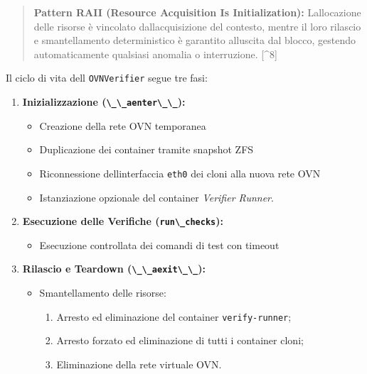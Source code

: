 \begin{quote}
\textbf{Pattern RAII (Resource Acquisition Is Initialization):}
L\textquotesingle allocazione delle risorse è vincolato
dall\textquotesingle acquisizione del contesto, mentre il loro rilascio
e smantellamento deterministico è garantito all\textquotesingle uscita
dal blocco, gestendo automaticamente qualsiasi anomalia o interruzione.
{[}\^{}8{]}
\end{quote}

Il ciclo di vita dell\textquotesingle{}
\passthrough{\lstinline!OVNVerifier!} segue tre fasi:

\begin{enumerate}
\def\labelenumi{\arabic{enumi}.}
\tightlist
\item
  \textbf{Inizializzazione (\passthrough{\lstinline!\_\_aenter\_\_!}):}

  \begin{itemize}
  \tightlist
  \item
    Creazione della rete OVN temporanea
  \item
    Duplicazione dei container tramite snapshot ZFS
  \item
    Riconnessione dell\textquotesingle interfaccia
    \passthrough{\lstinline!eth0!} dei cloni alla nuova rete OVN
  \item
    Istanziazione opzionale del container \emph{Verifier Runner}.
  \end{itemize}
\item
  \textbf{Esecuzione delle Verifiche
  (\passthrough{\lstinline!run\_checks!}):}

  \begin{itemize}
  \tightlist
  \item
    Esecuzione controllata dei comandi di test con timeout
  \end{itemize}
\item
  \textbf{Rilascio e Teardown
  (\passthrough{\lstinline!\_\_aexit\_\_!}):}

  \begin{itemize}
  \tightlist
  \item
    Smantellamento delle risorse:

    \begin{enumerate}
    \def\labelenumii{\arabic{enumii}.}
    \tightlist
    \item
      Arresto ed eliminazione del container
      \passthrough{\lstinline!verify-runner!};
    \item
      Arresto forzato ed eliminazione di tutti i container cloni;
    \item
      Eliminazione della rete virtuale OVN.
    \end{enumerate}
  \end{itemize}
\end{enumerate}


